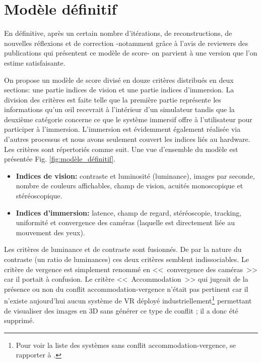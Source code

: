 	\section{Modèle définitif}		
	\par En définitive, après un certain nombre d'itérations, de reconstructions, de nouvelles réflexions et de correction -notamment grâce à l'avis de reviewers des publications qui présentent ce modèle de score- on parvient à une version que l'on estime satisfaisante.
	
	\par On propose un modèle de score divisé en douze critères distribués en deux sections: une partie indices de vision et une partie indices d'immersion. La division des critères est faite telle que la première partie représente les informations qu'un œil recevrait à l'intérieur d'un simulateur tandis que la deuxième catégorie concerne ce que le système immersif offre à l'utilisateur pour participer à l'immersion. L'immersion est évidemment également réalisée via d'autres processus et nous avons seulement couvert les indices liés au hardware. Les critères sont répertoriés comme suit. Une vue d'ensemble du modèle est présentée Fig. \ref{fig:modèle_définitif}.
	
	\begin{itemize}\itemsep12pt
		\item \textbf{Indices de vision:} contraste et luminosité (luminance), images par seconde, nombre de couleurs affichables, champ de vision, acuités monoscopique et stéréoscopique.
		\item \textbf{Indices d'immersion:} latence, champ de regard, stéréoscopie, tracking, uniformité et convergence des caméras (laquelle est directement liée au mouvement des yeux).
	\end{itemize}
	
	\par Les critères de luminance et de contraste sont fusionnés. De par la nature du contraste (un ratio de luminances) ces deux critères semblent indissociables. Le critère de vergence est simplement renommé en <<~convergence des caméras~>> car il portait à confusion. Le critère <<~Accommodation~>> qui jugeait de la présence ou non du conflit accommodation-vergence n'était pas pertinent car il n'existe aujourd'hui aucun système de VR déployé industriellement\footnote{Pour voir la liste des systèmes sans conflit accommodation-vergence, se rapporter à \citep{mehrabi_making_2013}.} permettant de visualiser des images en 3D sans générer ce type de conflit ; il a donc été supprimé.
	

